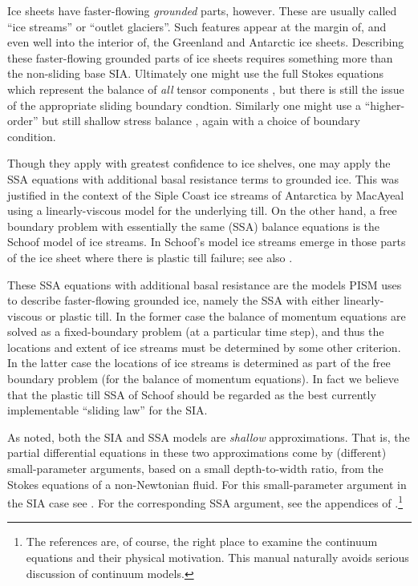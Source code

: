 \documentclass[11pt,final]{amsart}
\begin{document}
Ice sheets have faster-flowing \emph{grounded} parts, however.  These are usually called ``ice streams'' or ``outlet glaciers''.  Such features appear at the margin of, and even well into the interior of, the Greenland \cite{Joughinetal2001} and Antarctic \cite{BamberVaughanJoughin} ice sheets.  Describing these faster-flowing grounded parts of ice sheets requires something more than the non-sliding base SIA.  Ultimately one might use the full Stokes equations which represent the balance of \emph{all} tensor components \cite{Fowler}, but there is still the issue of the appropriate sliding boundary condtion.  Similarly one might use a ``higher-order'' but still shallow stress balance \cite{Blatter,Pattyn03}, again with a choice of boundary condition.

Though they apply with greatest confidence to ice shelves, one may apply the SSA equations with additional basal resistance terms to grounded ice.  This was justified in the context of the Siple Coast ice streams of Antarctica by MacAyeal \cite{MacAyeal,HulbeMacAyeal} using a linearly-viscous model for the underlying till.  On the other hand, a free boundary problem with essentially the same (SSA) balance equations is the Schoof \cite{SchoofStream} model of ice streams.  In Schoof's model ice streams emerge in those parts of the ice sheet where there is plastic till failure; see also \cite{SchoofTill}.

These SSA equations with additional basal resistance are the models PISM uses to describe faster-flowing grounded ice, namely the SSA with either linearly-viscous or plastic till.  In the former case the balance of momentum equations are solved as a fixed-boundary problem (at a particular time step), and thus the locations and extent of ice streams must be determined by some other criterion.  In the latter case the locations of ice streams is determined as part of the free boundary problem (for the balance of momentum equations).  In fact we believe that the plastic till SSA of Schoof should be regarded as the best currently implementable ``sliding law'' for the SIA.

As noted, both the SIA and SSA models are \emph{shallow} approximations.  That is, the partial differential equations in these two approximations come by (different) small-parameter arguments, based on a small depth-to-width ratio, from the Stokes equations of a non-Newtonian fluid.  For this small-parameter argument in the SIA case see \cite{Fowler}.  For the corresponding SSA argument, see the appendices of \cite{SchoofStream}.\footnote{The references are, of course, the right place to examine the continuum equations and their physical motivation.  This manual naturally avoids serious discussion of continuum models.}
\end{document}

